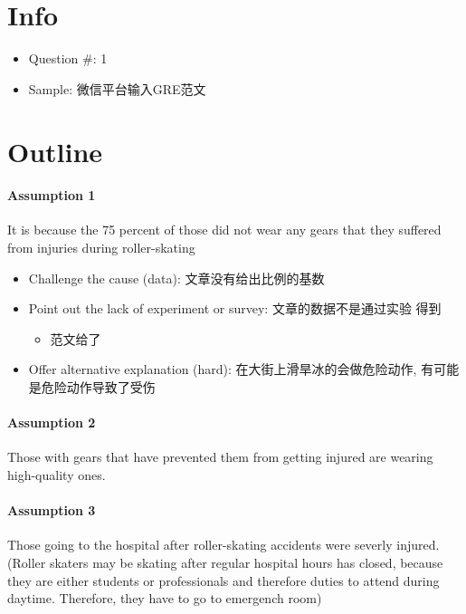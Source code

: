 \documentclass{article}
\begin{document}
  \section{Info}
    \begin{itemize}
      \item Question \#: 1
      \item Sample: 微信平台输入GRE范文
    \end{itemize}

  \section{Outline}

    \paragraph{Assumption 1} It is because the 75 percent of those did not
    wear any gears that they suffered from injuries during roller-skating
    \begin{itemize}
      \item Challenge the cause (data): 文章没有给出比例的基数
      \item Point out the lack of experiment or survey: 文章的数据不是通过实验
      得到
      \begin{itemize}
        \item 范文给了
      \end{itemize}

      \item Offer alternative explanation (hard): 在大街上滑旱冰的会做危险动作,
      有可能是危险动作导致了受伤
    \end{itemize}

    \paragraph{Assumption 2} Those with gears that have prevented them from
    getting injured are wearing high-quality ones.

    \paragraph{Assumption 3} Those going to the hospital after roller-skating
    accidents were severly injured. (Roller skaters may be skating after
    regular hospital hours has closed, because they are either students
    or professionals and therefore duties to attend during daytime. Therefore,
    they have to go to emergench room)
\end{document}
